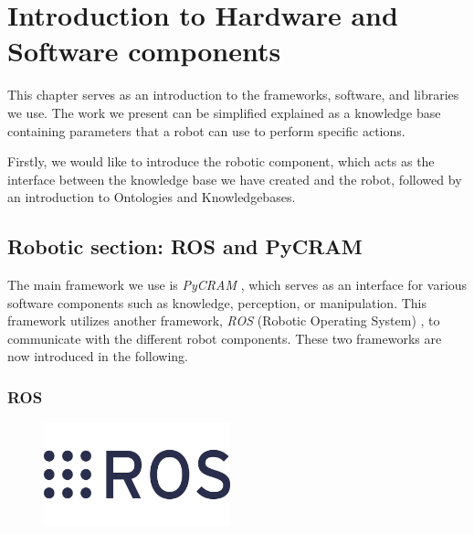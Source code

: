     \chapter{Introduction to Hardware and Software components}
    This chapter serves as an introduction to the frameworks, software, and libraries we use. The work we present can be simplified explained as a knowledge base containing parameters that a robot can use to perform specific actions.

    Firstly, we would like to introduce the robotic component, which acts as the interface between the knowledge base we have created and the robot, followed by an introduction to Ontologies and Knowledgebases.
    \section{Robotic section: ROS and PyCRAM}
    
    The main framework we use is \textit{PyCRAM} \cite{pycram}, which serves as an interface for various software components such as knowledge, perception, or manipulation. 
	This framework utilizes another framework, \textit{ROS} (Robotic Operating System) \cite{ros}, to communicate with the different robot components. These two frameworks are now introduced in the following.    
    \subsection{ROS}
	\label{sec:ROS}
    \begin{figure}
        \centering
        \includegraphics[width=0.48\textwidth]{Graphics/ROS.jpg}
    \end{figure}

